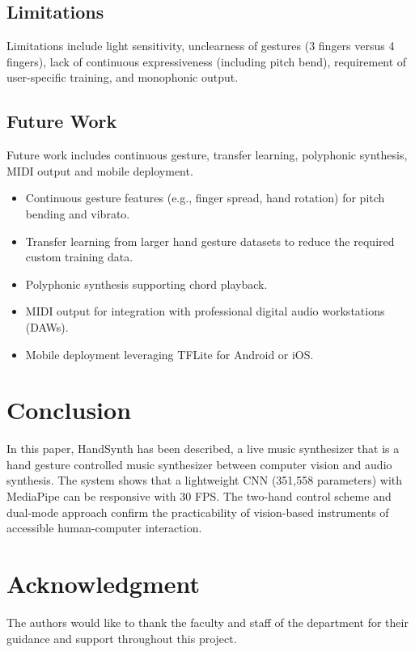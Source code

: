 \documentclass[conference]{IEEEtran}
\begin{document}
\subsection{Limitations}

Limitations include light sensitivity, unclearness of gestures (3 fingers versus 4 fingers), lack of continuous expressiveness (including pitch bend), requirement of user-specific training, and monophonic output.

\subsection{Future Work}

Future work includes continuous gesture, transfer learning, polyphonic synthesis, MIDI output and mobile deployment.

\begin{itemize}
\item Continuous gesture features (e.g., finger spread, hand rotation) for pitch bending and vibrato.
\item Transfer learning from larger hand gesture datasets to reduce the required custom training data.
\item Polyphonic synthesis supporting chord playback.
\item MIDI output for integration with professional digital audio workstations (DAWs).
\item Mobile deployment leveraging TFLite for Android or iOS.
\end{itemize}

\section{Conclusion}

In this paper, HandSynth has been described, a live music synthesizer that is a hand gesture controlled music synthesizer between computer vision and audio synthesis. The system shows that a lightweight CNN (351,558 parameters) with MediaPipe can be responsive with 30 FPS. The two-hand control scheme and dual-mode approach confirm the practicability of vision-based instruments of accessible human-computer interaction.

\section*{Acknowledgment}

The authors would like to thank the faculty and staff of the department for their guidance and support throughout this project.
\end{document}
